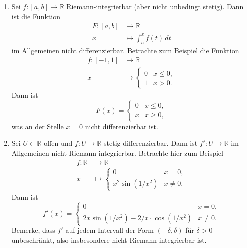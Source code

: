 \documentclass[../main.tex]{subfiles}
\begin{document}
\begin{remarks}
  \leavevmode
  \begin{enumerate}[(1)]
    \item Sei $f \colon [a, b] \to \mathbb{R}$ Riemann-integrierbar
      (aber nicht unbedingt stetig). Dann ist die Funktion
      \begin{align*}
        F \colon [a, b] & \to \mathbb{R} \\
        x & \mapsto \int_{a}^{x} f(t) \, dt
      \end{align*}
      im Allgemeinen nicht differenzierbar.
      Betrachte zum Beispiel die Funktion
      \begin{align*}
        f \colon [-1, 1] & \to \mathbb{R} \\
        x & \mapsto
        \begin{cases}
          0 & x \leq 0,\\
          1 & x > 0.
        \end{cases}
      \end{align*}
      Dann ist
      \[
        F(x) =
        \begin{cases}
          0 & x \leq 0,\\
          x & x \geq 0,
        \end{cases}
      \]
      was an der Stelle $x = 0$ nicht differenzierbar ist.
    \item Sei $U \subset \mathbb{R}$ offen und
      $f \colon U \to \mathbb{R}$ stetig differenzierbar.
      Dann ist $f' \colon U \to \mathbb{R}$ im Allgemeinen
      nicht Riemann-integrierbar.
      Betrachte hier zum Beispiel
      \begin{align*}
        f \colon \mathbb{R} & \to \mathbb{R} \\
        x & \mapsto
        \begin{cases}
          0 & x = 0, \\
          x^2 \sin(1/x^2) & x \neq 0.
        \end{cases}
      \end{align*}
      Dann ist
      \[
        f'(x) =
        \begin{cases}
          0 & x = 0,\\
          2x \sin(1/x^2) - 2/x \cdot \cos(1/x^2) & x \neq 0.
        \end{cases}
      \]
      Bemerke, dass $f'$ auf jedem Intervall
      der Form $(-\delta, \delta)$ für $\delta > 0$
      unbeschränkt, also insbesondere
      nicht Riemann-integrierbar ist.
  \end{enumerate}
\end{remarks}
\end{document}
